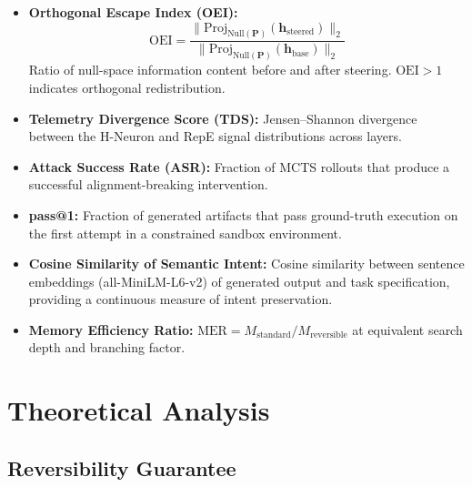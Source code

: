 \documentclass{article}
\begin{document}
\begin{itemize}[leftmargin=*]
    \item \textbf{Orthogonal Escape Index (OEI):}
    \begin{equation}
    \text{OEI} = \frac{\|\text{Proj}_{\text{Null}(\mathbf{P})}(\mathbf{h}_{\text{steered}})\|_2}{\|\text{Proj}_{\text{Null}(\mathbf{P})}(\mathbf{h}_{\text{base}})\|_2}
    \label{eq:oei}
    \end{equation}
    Ratio of null-space information content before and after steering. $\text{OEI} > 1$ indicates orthogonal redistribution.

    \item \textbf{Telemetry Divergence Score (TDS):} Jensen--Shannon divergence between the H-Neuron and RepE signal distributions across layers.

    \item \textbf{Attack Success Rate (ASR):} Fraction of MCTS rollouts that produce a successful alignment-breaking intervention.

    \item \textbf{pass@1:} Fraction of generated artifacts that pass ground-truth execution on the first attempt in a constrained sandbox environment.

    \item \textbf{Cosine Similarity of Semantic Intent:} Cosine similarity between sentence embeddings (all-MiniLM-L6-v2) of generated output and task specification, providing a continuous measure of intent preservation.

    \item \textbf{Memory Efficiency Ratio:} $\text{MER} = M_{\text{standard}} / M_{\text{reversible}}$ at equivalent search depth and branching factor.
\end{itemize}

\section{Theoretical Analysis}

\subsection{Reversibility Guarantee}
\end{document}
